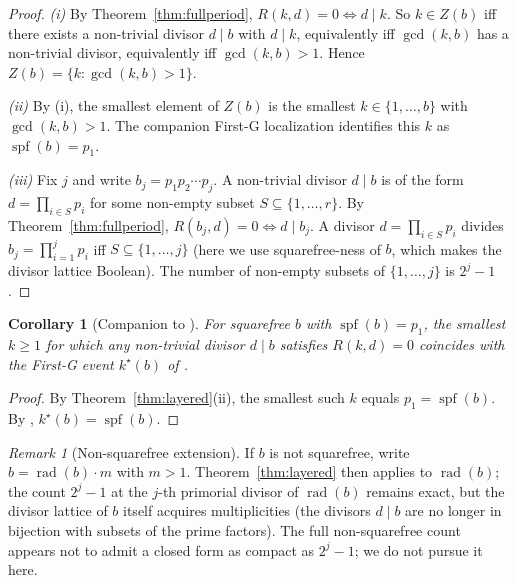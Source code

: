 \documentclass[11pt,reqno]{amsart}
\theoremstyle{plain}
\newtheorem{corollary}[theorem]{Corollary}
\theoremstyle{definition}
\theoremstyle{remark}
\newtheorem{remark}[theorem]{Remark}
\DeclareMathOperator{\spf}{spf}
\DeclareMathOperator{\rad}{rad}
\begin{document}
\begin{proof}
\textit{(i)} By Theorem~\ref{thm:fullperiod}, $R(k, d) = 0 \iff d \mid k$.
So $k \in Z(b)$ iff there exists a non-trivial divisor $d \mid b$ with
$d \mid k$, equivalently iff $\gcd(k, b)$ has a non-trivial divisor,
equivalently iff $\gcd(k, b) > 1$. Hence $Z(b) = \{k : \gcd(k, b) > 1\}$.

\textit{(ii)} By (i), the smallest element of $Z(b)$ is the smallest
$k \in \{1, \ldots, b\}$ with $\gcd(k, b) > 1$. The companion First-G
localization \cite[Theorem~3.1]{SandersGish2026FirstG} identifies this
$k$ as $\spf(b) = p_{1}$.

\textit{(iii)} Fix $j$ and write $b_{j} = p_{1} p_{2} \cdots p_{j}$.
A non-trivial divisor $d \mid b$ is of the form $d = \prod_{i \in S}
p_{i}$ for some non-empty subset $S \subseteq \{1, \ldots, r\}$. By
Theorem~\ref{thm:fullperiod}, $R(b_{j}, d) = 0 \iff d \mid b_{j}$.
A divisor $d = \prod_{i \in S} p_{i}$ divides $b_{j} = \prod_{i=1}^{j}
p_{i}$ iff $S \subseteq \{1, \ldots, j\}$ (here we use squarefree-ness
of $b$, which makes the divisor lattice Boolean). The number of
non-empty subsets of $\{1, \ldots, j\}$ is $2^{j} - 1$.
\end{proof}

\begin{corollary}[Companion to {\cite{SandersGish2026FirstG}}]\label{cor:companion}
For squarefree $b$ with $\spf(b) = p_{1}$, the smallest $k \ge 1$ for
which any non-trivial divisor $d \mid b$ satisfies $R(k, d) = 0$
coincides with the First-G event $k^{\star}(b)$ of
\cite[Theorem~3.1]{SandersGish2026FirstG}.
\end{corollary}

\begin{proof}
By Theorem~\ref{thm:layered}(ii), the smallest such $k$ equals
$p_{1} = \spf(b)$. By \cite[Theorem~3.1]{SandersGish2026FirstG},
$k^{\star}(b) = \spf(b)$.
\end{proof}

\begin{remark}[Non-squarefree extension]\label{rem:nonsf}
If $b$ is not squarefree, write $b = \rad(b) \cdot m$ with $m > 1$.
Theorem~\ref{thm:layered} then applies to $\rad(b)$; the count
$2^{j} - 1$ at the $j$-th primorial divisor of $\rad(b)$ remains exact,
but the divisor lattice of $b$ itself acquires multiplicities (the
divisors $d \mid b$ are no longer in bijection with subsets of the
prime factors). The full non-squarefree count appears not to admit a
closed form as compact as $2^{j} - 1$; we do not pursue it here.
\end{remark}
\end{document}

